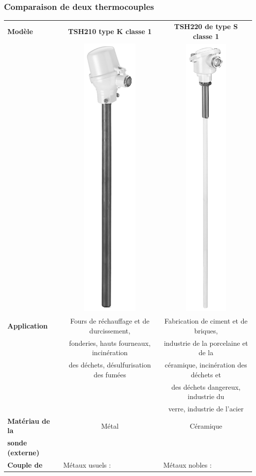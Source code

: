 \documentclass{article}
\begin{document}
        \subsubsection{Comparaison de deux thermocouples}
        \begin{table}[H]
        \centering
        \begin{tabular}{l|c|c}
            \textbf{Modèle} & \textbf{TSH210 type K classe 1} & \textbf{TSH220  de type S classe 1}\\
            & \includegraphics[width=0.05\linewidth]{./images/thermocouple-TSH210.png} & \includegraphics[width=0.04\linewidth]{./images/thermocouple-TSH220.png}\\
            \hline
            \textbf{Application}        & Fours de réchauffage et de durcissement, & Fabrication de ciment et de briques,   \\
                                        & fonderies, hauts fourneaux, incinération & industrie de la porcelaine et de la    \\
                                        & des déchets, désulfurisation des fumées  & céramique, incinération des déchets et \\
                                        &                                          & des déchets dangereux, industrie du    \\
                                        &                                          & verre, industrie de l'acier            \\
            \hline
            \textbf{Matériau de la}     & Métal                                     & Céramique\\
            \textbf{sonde (externe)}    & & \\
            \hline
            \textbf{Couple de}          & \multicolumn{1}{l|}{Métaux usuels :}               & \multicolumn{1}{l}{Métaux nobles :}\\

\end{tabular}
\end{table}
\end{document}
